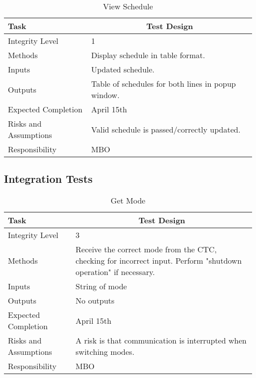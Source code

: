 \documentclass[]{article}
\begin{document}
\begin{table}[H]
	\centering
	\caption{View Schedule}
	\begin{tabular}{|l|l|}
		\hline
		Task & \multicolumn{1}{c|}{Test Design} \\ \hline
		Integrity Level & 1 \\ \hline
		Methods & Display schedule in table format.\\ \hline
		Inputs &  Updated schedule. \\ \hline
		Outputs &  Table of schedules for both lines in popup window. \\ \hline
		Expected Completion & \parbox[t]{10cm}{April 15th}\\ \hline
		Risks and Assumptions & \parbox[t]{10cm}{Valid schedule is passed/correctly updated.} \\ \hline
		Responsibility & MBO\\ \hline
	\end{tabular}
\end{table}

\subsection{Integration Tests}

\begin{table}[H]
	\centering
	\caption{Get Mode}
	\begin{tabular}{|l|l|}
		\hline
		Task & \multicolumn{1}{c|}{Test Design} \\ \hline
		Integrity Level & 3 \\ \hline
		Methods & \parbox[t]{10cm}{Receive the correct mode from the CTC, checking for incorrect input. Perform "shutdown operation" if necessary.}\\ \hline
		Inputs &  String of mode \\ \hline
		Outputs &  No outputs \\ \hline
		Expected Completion & \parbox[t]{10cm}{April 15th}\\ \hline
		Risks and Assumptions & \parbox[t]{10cm}{A risk is that communication is interrupted when switching modes.} \\ \hline
		Responsibility & MBO\\ \hline
	\end{tabular}
\end{table}
\end{document}
